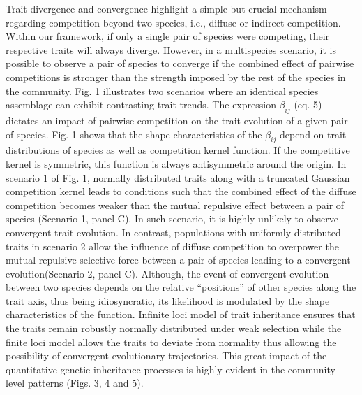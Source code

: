 \documentclass[12pt]{article}
\begin{document}
Trait divergence and convergence highlight a simple but crucial mechanism regarding competition beyond two species, i.e., diffuse or indirect competition. Within our framework, if only a single pair of species were competing, their respective traits will always diverge. However, in a multispecies scenario, it is possible to observe a pair of species to converge if the combined effect of pairwise competitions is stronger than the strength imposed by the rest of the species in the community. Fig. 1 illustrates two scenarios where an identical species assemblage can exhibit contrasting trait trends. The expression $\beta_{ij}$ (eq. 5) dictates an impact of pairwise competition on the trait evolution of a given pair of species. Fig. 1 shows that the shape characteristics of the $\beta_{ij}$ depend on trait distributions of species as well as competition kernel function. If the competitive kernel is symmetric, this function is always antisymmetric around the origin. In scenario 1 of Fig. 1, normally distributed traits along with a truncated Gaussian competition kernel leads to conditions such that the combined effect of the diffuse competition becomes weaker than the mutual repulsive effect between a pair of species (Scenario 1, panel C). In such scenario, it is highly unlikely to observe convergent trait evolution. In contrast, populations with uniformly distributed traits in scenario 2 allow the influence of diffuse competition to overpower the mutual repulsive selective force between a pair of species leading to a convergent evolution(Scenario 2, panel C). Although, the event of convergent evolution between two species depends on the relative “positions” of other species along the trait axis, thus being idiosyncratic, its likelihood is modulated by the shape characteristics of the function. Infinite loci model of trait inheritance ensures that the traits remain robustly normally distributed under weak selection while the finite loci model allows the traits to deviate from normality thus allowing the possibility of convergent evolutionary trajectories. This great impact of the quantitative genetic inheritance processes is highly evident in the community-level patterns (Figs. 3, 4 and 5). \par
\end{document}
